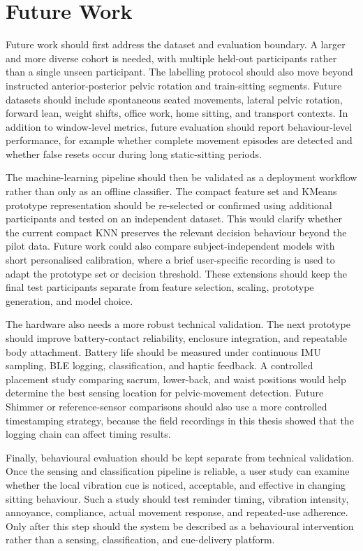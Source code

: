 \section{Future Work}

Future work should first address the dataset and evaluation boundary. A larger and more diverse cohort is needed, with multiple held-out participants rather than a single unseen participant. The labelling protocol should also move beyond instructed anterior-posterior pelvic rotation and train-sitting segments. Future datasets should include spontaneous seated movements, lateral pelvic rotation, forward lean, weight shifts, office work, home sitting, and transport contexts. In addition to window-level metrics, future evaluation should report behaviour-level performance, for example whether complete movement episodes are detected and whether false resets occur during long static-sitting periods.

The machine-learning pipeline should then be validated as a deployment workflow rather than only as an offline classifier. The compact feature set and KMeans prototype representation should be re-selected or confirmed using additional participants and tested on an independent dataset. This would clarify whether the current compact KNN preserves the relevant decision behaviour beyond the pilot data. Future work could also compare subject-independent models with short personalised calibration, where a brief user-specific recording is used to adapt the prototype set or decision threshold. These extensions should keep the final test participants separate from feature selection, scaling, prototype generation, and model choice.

The hardware also needs a more robust technical validation. The next prototype should improve battery-contact reliability, enclosure integration, and repeatable body attachment. Battery life should be measured under continuous IMU sampling, BLE logging, classification, and haptic feedback. A controlled placement study comparing sacrum, lower-back, and waist positions would help determine the best sensing location for pelvic-movement detection. Future Shimmer or reference-sensor comparisons should also use a more controlled timestamping strategy, because the field recordings in this thesis showed that the logging chain can affect timing results.

Finally, behavioural evaluation should be kept separate from technical validation. Once the sensing and classification pipeline is reliable, a user study can examine whether the local vibration cue is noticed, acceptable, and effective in changing sitting behaviour. Such a study should test reminder timing, vibration intensity, annoyance, compliance, actual movement response, and repeated-use adherence. Only after this step should the system be described as a behavioural intervention rather than a sensing, classification, and cue-delivery platform.
